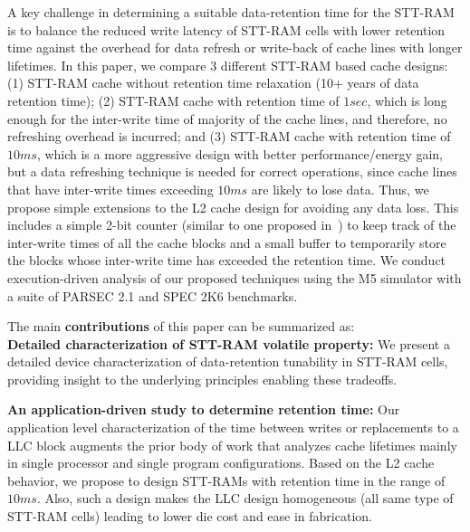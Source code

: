 
A key challenge in determining a suitable data-retention time for the STT-RAM is to balance the
reduced write latency of STT-RAM cells with lower retention time against the overhead for data refresh or
write-back of cache lines with longer lifetimes. In this paper, we compare 3 different STT-RAM based
cache designs: (1) STT-RAM cache without retention time relaxation (10+ years of data retention
time); (2) STT-RAM cache with retention time of $1sec$, which is long enough for the inter-write time of
majority of the cache lines, and therefore, no refreshing overhead is incurred;  and (3) STT-RAM cache with
retention time of $10ms$, which is a more aggressive design with better performance/energy gain, but a
data refreshing technique is needed for correct operations, since cache lines that have inter-write times
exceeding $10ms$ are likely to lose data. Thus, we propose simple extensions to the L2 cache design
for avoiding any data loss. This includes a simple 2-bit counter (similar to one proposed
in~\cite{cache-decay-2001}) to keep track of the inter-write times of all the cache blocks and a small buffer
to temporarily store the blocks whose inter-write time has exceeded the retention time. We conduct
execution-driven analysis of our proposed techniques using the M5 simulator with
a suite of PARSEC 2.1 and SPEC 2K6 benchmarks.

The main {\bf contributions} of this paper can be summarized as: \\
\noindent\textbf{Detailed characterization of STT-RAM volatile property:} We present a detailed
device characterization of data-retention tunability in STT-RAM cells, providing insight to the
underlying principles enabling these tradeoffs.

\noindent\textbf{An application-driven study to determine retention time:}
Our application level characterization of the time between writes or replacements to a
LLC block augments the prior body of work that analyzes cache lifetimes mainly
in single processor and single program configurations. Based on the L2 cache behavior,
we propose to design STT-RAMs with retention time in the range of $10ms$.
Also, such a design
makes the LLC design homogeneous (all same type of STT-RAM cells) leading to lower die cost and ease in fabrication.


